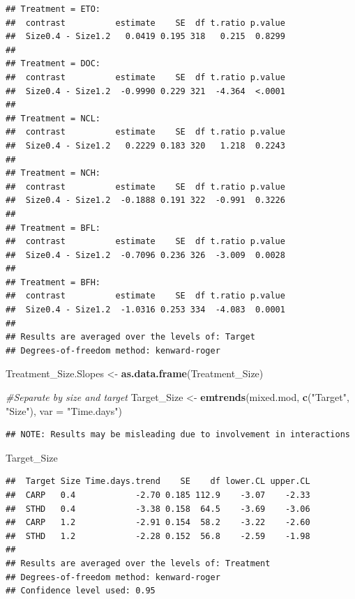 \documentclass[
]{article}
\newenvironment{Shaded}{\begin{snugshade}}{\end{snugshade}}
\newcommand{\AttributeTok}[1]{\textcolor[rgb]{0.13,0.29,0.53}{#1}}
\newcommand{\CommentTok}[1]{\textcolor[rgb]{0.56,0.35,0.01}{\textit{#1}}}
\newcommand{\FunctionTok}[1]{\textcolor[rgb]{0.13,0.29,0.53}{\textbf{#1}}}
\newcommand{\NormalTok}[1]{#1}
\newcommand{\OtherTok}[1]{\textcolor[rgb]{0.56,0.35,0.01}{#1}}
\newcommand{\StringTok}[1]{\textcolor[rgb]{0.31,0.60,0.02}{#1}}
\begin{document}
\begin{verbatim}
## Treatment = ETO:
##  contrast          estimate    SE  df t.ratio p.value
##  Size0.4 - Size1.2   0.0419 0.195 318   0.215  0.8299
## 
## Treatment = DOC:
##  contrast          estimate    SE  df t.ratio p.value
##  Size0.4 - Size1.2  -0.9990 0.229 321  -4.364  <.0001
## 
## Treatment = NCL:
##  contrast          estimate    SE  df t.ratio p.value
##  Size0.4 - Size1.2   0.2229 0.183 320   1.218  0.2243
## 
## Treatment = NCH:
##  contrast          estimate    SE  df t.ratio p.value
##  Size0.4 - Size1.2  -0.1888 0.191 322  -0.991  0.3226
## 
## Treatment = BFL:
##  contrast          estimate    SE  df t.ratio p.value
##  Size0.4 - Size1.2  -0.7096 0.236 326  -3.009  0.0028
## 
## Treatment = BFH:
##  contrast          estimate    SE  df t.ratio p.value
##  Size0.4 - Size1.2  -1.0316 0.253 334  -4.083  0.0001
## 
## Results are averaged over the levels of: Target 
## Degrees-of-freedom method: kenward-roger
\end{verbatim}

\begin{Shaded}
\begin{Highlighting}[]
\NormalTok{Treatment\_Size.Slopes }\OtherTok{\textless{}{-}} \FunctionTok{as.data.frame}\NormalTok{(Treatment\_Size)}

\CommentTok{\#Separate by size and target}
\NormalTok{Target\_Size }\OtherTok{\textless{}{-}} \FunctionTok{emtrends}\NormalTok{(mixed.mod, }\FunctionTok{c}\NormalTok{(}\StringTok{"Target"}\NormalTok{, }\StringTok{"Size"}\NormalTok{), }\AttributeTok{var =} \StringTok{"Time.days"}\NormalTok{)}
\end{Highlighting}
\end{Shaded}

\begin{verbatim}
## NOTE: Results may be misleading due to involvement in interactions
\end{verbatim}

\begin{Shaded}
\begin{Highlighting}[]
\NormalTok{Target\_Size}
\end{Highlighting}
\end{Shaded}

\begin{verbatim}
##  Target Size Time.days.trend    SE    df lower.CL upper.CL
##  CARP   0.4            -2.70 0.185 112.9    -3.07    -2.33
##  STHD   0.4            -3.38 0.158  64.5    -3.69    -3.06
##  CARP   1.2            -2.91 0.154  58.2    -3.22    -2.60
##  STHD   1.2            -2.28 0.152  56.8    -2.59    -1.98
## 
## Results are averaged over the levels of: Treatment 
## Degrees-of-freedom method: kenward-roger 
## Confidence level used: 0.95
\end{verbatim}
\end{document}
